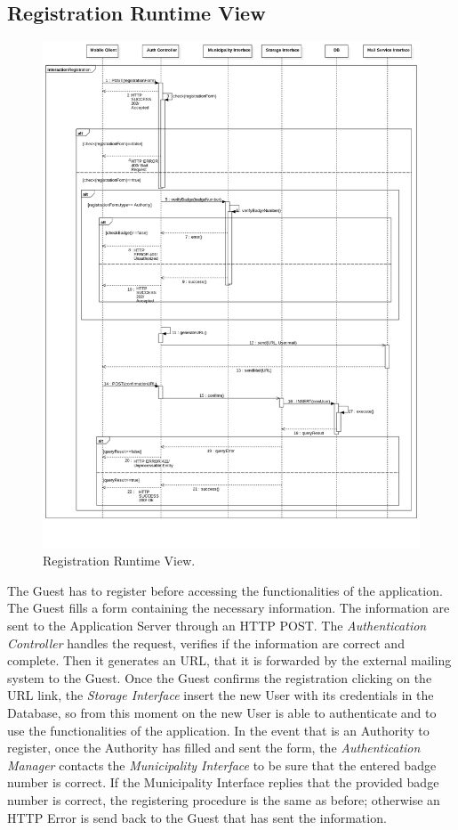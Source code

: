 \documentclass{report}
\begin{document}
\subsection{Registration Runtime View}
\begin{figure}[!ht]
	\begin{center}
	\includegraphics[width=\textwidth]{img/Registration1.png}
    \end{center}
    \label{fig:RegistrationSD}
	\caption{Registration Runtime View.}
\end{figure}
The Guest has to register before accessing the functionalities of the application. The Guest fills a form containing the necessary information. The information are sent to the Application Server through an HTTP POST. The \textit{Authentication Controller} handles the request, verifies if the information are correct and complete. Then it generates an URL, that it is forwarded by the external mailing system to the Guest. Once the Guest confirms the registration clicking on the URL link, the \textit{Storage Interface} insert the new User with its credentials in the Database, so from this moment on the new User is able to authenticate and to use the functionalities of the application.
In the event that is an Authority to register, once the Authority has filled and sent the form, the \textit{Authentication Manager} contacts the \textit{Municipality Interface} to be sure that the entered badge number is correct. If the Municipality Interface replies that the provided badge number is correct, the registering procedure is the same as before; otherwise an HTTP Error is send back to the Guest that has sent the information.    
\end{document}
